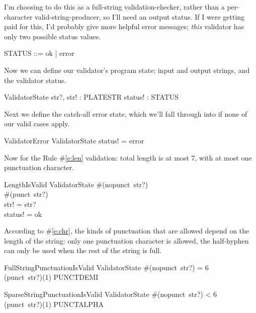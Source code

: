 \documentclass[11pt]{article}
\begin{document}
\begin{spec}
  I'm choosing to do this as a full-string validation-checker, rather than a per-character
  valid-string-producer, so I'll need an output status.  If I were getting paid for this, I'd
  probably give more helpful error messages; \textit{this} validator has only two possible status
  values.

  \begin{zed}
    STATUS ::= ok | error
  \end{zed}

  Now we can define our validator's program state; input and output strings, and the validator
  status.

  \begin{schema}{ValidatorState}
    str?, str! : PLATESTR \also
    status! : STATUS
  \end{schema}

  Next we define the catch-all error state, which we'll fall through into if none of our valid cases
  apply.

  \begin{schema}{ValidatorError}
    ValidatorState
    \where
    status! = error
  \end{schema}

  Now for the Rule \#\ref{e:len} validation: total length is at most 7, with at most one punctuation
  character.

  \begin{schema}{LengthIsValid}
    ValidatorState
    \where
    \#(nopunct~str?)  \\
    \#(punct~str?)  \\
    str! = str? \\
    status! = ok
  \end{schema}

  According to \#\ref{e:chr}, the kinds of punctuation that are allowed depend on the length of the
  string: only one punctuation character is allowed, the half-hyphen can only be used when the rest
  of the string is full.

  \begin{schema}{FullStringPunctuationIsValid}
    ValidatorState
    \where
    \#(nopunct~str?) = 6 \\
    (punct~str?)(1) \in PUNCTDEMI
  \end{schema}
    
  \begin{schema}{SparseStringPunctuationIsValid}
    ValidatorState
    \where
    \#(nopunct~str?) < 6 \\
    (punct~str?)(1) \in PUNCTALPHA
  \end{schema}


\end{spec}
\end{document}
